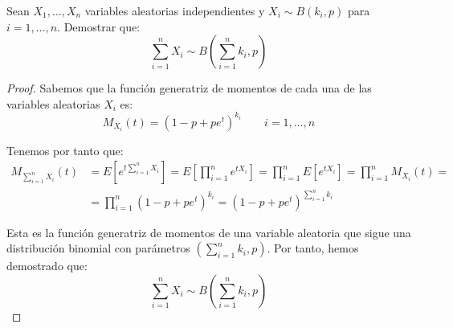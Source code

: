 \begin{ejercicio}
    Sean $X_1, \dots, X_n$ variables aleatorias independientes y $X_i\sim B(k_i, p)$ para $i=1,\dots,n$. Demostrar que:
    \begin{equation*}
        \sum_{i=1}^{n}X_i \sim B\left(\sum_{i=1}^{n}k_i, p\right)
    \end{equation*}

    \begin{proof}
        Sabemos que la función generatriz de momentos de cada una de las variables aleatorias $X_i$ es:
        \begin{equation*}
            M_{X_i}(t) = (1-p+pe^t)^{k_i} \qquad i=1,\dots,n
        \end{equation*}

        Tenemos por tanto que:
        \begin{align*}
            M_{\sum\limits_{i=1}^{n}X_i}(t) &= E\left[e^{t\sum\limits_{i=1}^{n}X_i}\right] = E\left[\prod_{i=1}^{n}e^{tX_i}\right] = \prod_{i=1}^{n}E[e^{tX_i}] = \prod_{i=1}^{n}M_{X_i}(t) =\\
            &= \prod_{i=1}^{n}(1-p+pe^t)^{k_i} = (1-p+pe^t)^{\sum\limits_{i=1}^{n}k_i}
        \end{align*}

        Esta es la función generatriz de momentos de una variable aleatoria que sigue una distribución binomial con parámetros $\left(\sum\limits_{i=1}^{n}k_i, p\right)$. Por tanto, hemos demostrado que:
        \begin{equation*}
            \sum_{i=1}^{n}X_i \sim B\left(\sum_{i=1}^{n}k_i, p\right)
        \end{equation*}
    \end{proof}
\end{ejercicio}



